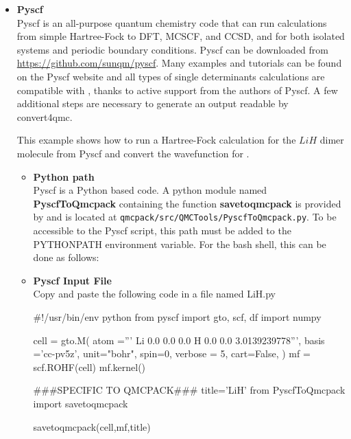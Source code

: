 \begin{itemize}
\item \textbf{Pyscf}\\

Pyscf\cite{Sun2018} is an all-purpose quantum chemistry code that can
run calculations from simple Hartree-Fock to DFT, MCSCF, and CCSD, and
for both isolated systems and periodic boundary conditions. Pyscf can
be downloaded from \url{https://github.com/sunqm/pyscf}. Many examples
and tutorials can be found on the Pyscf website and all types of
single determinants calculations are compatible with \qmcpack, thanks
to active support from the authors of Pyscf. A few additional steps
are necessary to generate an output readable by convert4qmc.


This example shows how to run a Hartree-Fock calculation for the $LiH$
dimer molecule from Pyscf and convert the wavefunction for \qmcpack.\\

\begin{itemize}
 \item \textbf{Python path}\\
Pyscf is a Python based code. A python module named \textbf{PyscfToQmcpack} containing the function \textbf{savetoqmcpack} is provided by \qmcpack and is located at \texttt{qmcpack/src/QMCTools/PyscfToQmcpack.py}.
To be accessible to the Pyscf script, this path must be added to the PYTHONPATH environment variable.
For the bash shell, this can be done as follows:\\


 \item \textbf{Pyscf Input File}\\
 
Copy and paste the following code in a file named LiH.py

\begin{shade}
#!/usr/bin/env python
from pyscf import gto, scf, df
import numpy

cell = gto.M(
   atom ='''
Li 0.0 0.0 0.0
H  0.0 0.0 3.0139239778''',
   basis ='cc-pv5z',
   unit="bohr",
   spin=0,
   verbose = 5,
   cart=False,
)
mf = scf.ROHF(cell)
mf.kernel()

###SPECIFIC TO QMCPACK###
title='LiH'
from PyscfToQmcpack import savetoqmcpack

savetoqmcpack(cell,mf,title)
 

\end{shade}
\end{itemize}
\end{itemize}
